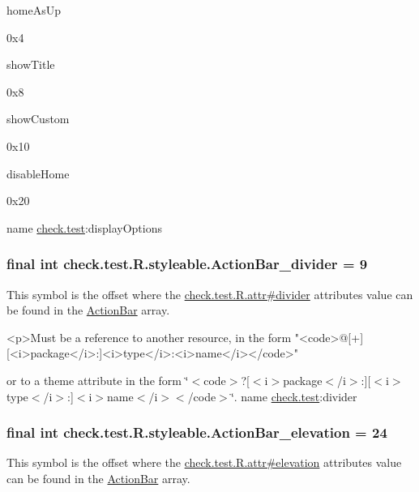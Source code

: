 {\ttfamily home\+As\+Up}

0x4

{\ttfamily show\+Title}

0x8

{\ttfamily show\+Custom}

0x10

{\ttfamily disable\+Home}

0x20

name \hyperlink{namespacecheck_1_1test}{check.\+test}\+:display\+Options \hypertarget{classcheck_1_1test_1_1_r_1_1styleable_a0d32a23092ef9676e80af1baef491e9b}{}
\subsubsection[{Action\+Bar\+\_\+divider}]{\setlength{\rightskip}{0pt plus 5cm}final int check.\+test.\+R.\+styleable.\+Action\+Bar\+\_\+divider = 9\hspace{0.3cm}{\ttfamily [static]}}\label{classcheck_1_1test_1_1_r_1_1styleable_a0d32a23092ef9676e80af1baef491e9b}
This symbol is the offset where the \hyperlink{classcheck_1_1test_1_1_r_1_1attr_abda5d171fa2d828b6f8ccf9f4fc707ea}{check.\+test.\+R.\+attr\#divider} attribute\textquotesingle{}s value can be found in the \hyperlink{classcheck_1_1test_1_1_r_1_1styleable_ad0a4d403cb244ea4d22c6f6ebf2c2cdf}{Action\+Bar} array.

\begin{DoxyVerb}      <p>Must be a reference to another resource, in the form "<code>@[+][<i>package</i>:]<i>type</i>:<i>name</i></code>"
\end{DoxyVerb}
 or to a theme attribute in the form \char`\"{}$<$code$>$?\mbox{[}$<$i$>$package$<$/i$>$\+:\mbox{]}\mbox{[}$<$i$>$type$<$/i$>$\+:\mbox{]}$<$i$>$name$<$/i$>$$<$/code$>$\char`\"{}.  name \hyperlink{namespacecheck_1_1test}{check.\+test}\+:divider \hypertarget{classcheck_1_1test_1_1_r_1_1styleable_a04317e16738cdda5538f180e12395b7c}{}
\subsubsection[{Action\+Bar\+\_\+elevation}]{\setlength{\rightskip}{0pt plus 5cm}final int check.\+test.\+R.\+styleable.\+Action\+Bar\+\_\+elevation = 24\hspace{0.3cm}{\ttfamily [static]}}\label{classcheck_1_1test_1_1_r_1_1styleable_a04317e16738cdda5538f180e12395b7c}
This symbol is the offset where the \hyperlink{classcheck_1_1test_1_1_r_1_1attr_acf20b055f3e563dc5c426990bf2b3b7e}{check.\+test.\+R.\+attr\#elevation} attribute\textquotesingle{}s value can be found in the \hyperlink{classcheck_1_1test_1_1_r_1_1styleable_ad0a4d403cb244ea4d22c6f6ebf2c2cdf}{Action\+Bar} array.

